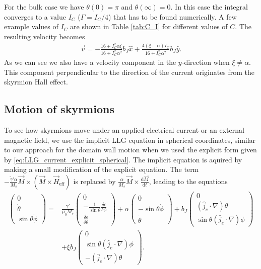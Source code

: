 \documentclass[1p]{elsarticle}		%
\numberwithin{equation}{section}
\begin{document}
For the bulk case we have $\theta(0) = \pi$ and $\theta(\infty) = 0$. In this case the integral converges to a value $I_C$ ($\Gamma=I_C/4$) that has to be found numerically. A few example values of $I_C$ are shown in Table \ref{tab:C_I} for different values of $C$. The resulting velocity becomes
\begin{align}
\vec{v} = -\frac{16+I_C^2\alpha\xi}{16+I_C^2\alpha^2}b_J\hat{x} + \frac{4(\xi-\alpha)I_C}{16+I_C^2\alpha^2}b_J\hat{y}.
\end{align}
As we can see we also have a velocity component in the $y$-direction when $\xi\neq\alpha$. This component perpendicular to the direction of the current originates from the skyrmion Hall effect.

\subsection{Motion of skyrmions}
To see how skyrmions move under an applied electrical current or an external magnetic field, we use the implicit LLG equation in spherical coordinates, similar to our approach for the domain wall motion when we used the explicit form given by \eqref{eq:LLG_current_explicit_spherical}. The implicit equation is aquired by making a small modification of the explicit equation. The term $-\frac{\tilde{\gamma}'\alpha}{M_s}\vec{M}\times(\vec{M}\times\vec{H}_{\text{eff}})$ is replaced by $\frac{\alpha}{M_s}\vec{M}\times\frac{\textrm{d}\vec{M}}{\textrm{d}t}$, leading to the equations
\begin{align}
\nonumber \begin{pmatrix}
0 \\ \dot{\theta} \\ \sin\theta\dot{\phi}
\end{pmatrix} =
&\frac{\gamma'}{\mu_0 M_s}
\begin{pmatrix}
0 \\ -\frac{1}{\sin\theta} \frac{\delta \epsilon}{\delta \phi} \\ \frac{\delta \epsilon}{\delta \theta}
\end{pmatrix} + \alpha
\begin{pmatrix}
0 \\ -\sin\theta\dot{\phi} \\ \dot{\theta}
\end{pmatrix} + b_J
\begin{pmatrix}
0 \\ (\hat{j}_e\cdot\nabla)\theta \\ \sin\theta(\hat{j}_e\cdot\nabla)\phi
\end{pmatrix} \\
&+\xi b_J
\begin{pmatrix}
0 \\ \sin\theta(\hat{j}_e\cdot\nabla)\phi \\ -(\hat{j}_e\cdot\nabla)\theta
\end{pmatrix}.
\label{eq:LLG_current_implicit_spherical}
\end{align}
\end{document}
